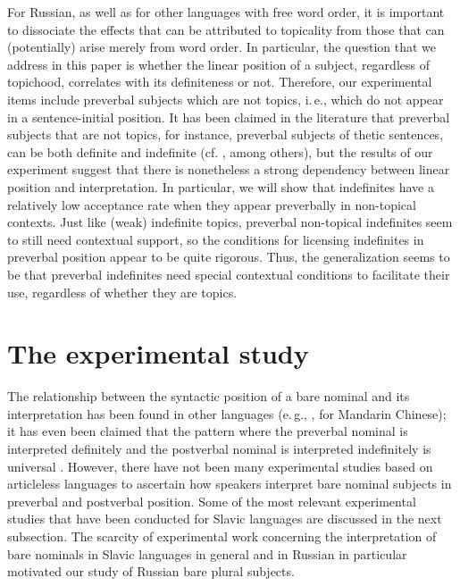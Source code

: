 \documentclass[output=paper]{langsci/langscibook}
\begin{document}
For Russian, as well as for other languages with free word order, it is important to dissociate the effects that can be attributed to topicality from those that can (potentially) arise merely from word order. In particular, the question that we address in this paper is whether the linear position of a subject, regardless of topichood, correlates with its definiteness or not. Therefore, our experimental items include preverbal subjects which are not topics, i.\,e., which do not appear in a sentence-initial position. It has been claimed in the literature that preverbal subjects that are not topics, for instance, preverbal subjects of thetic sentences, can be both definite and indefinite (cf. \citealt{geist:10}, among others), but the results of our experiment suggest that there is nonetheless a strong dependency between linear position and interpretation. In particular, we will show that indefinites have a relatively low acceptance rate when they appear preverbally in non-topical contexts. Just like (weak) indefinite topics, preverbal non-topical indefinites seem to still need contextual support, so the conditions for licensing indefinites in preverbal position appear to be quite rigorous. Thus, the generalization seems to be that preverbal indefinites need special contextual conditions to facilitate their use, regardless of whether they are topics.


\section{The experimental study}\label{2sec:3}

The relationship between the syntactic position of a bare nominal and its interpretation has been found in other languages (e.\,g., \citealt{cheng:sybesma:14}, for Mandarin Chinese); it has even been claimed that the pattern where the preverbal nominal is interpreted definitely and the postverbal nominal is interpreted indefinitely is universal \citep{leiss:07}. However, there have not been many experimental studies based on articleless languages to ascertain how speakers interpret bare nominal subjects in preverbal and postverbal position. Some of the most relevant experimental studies that have been conducted for Slavic languages are discussed in the next subsection. The scarcity of experimental work concerning the interpretation of bare nominals in Slavic languages in general and in Russian in particular motivated our study of Russian bare plural subjects.
\end{document}
